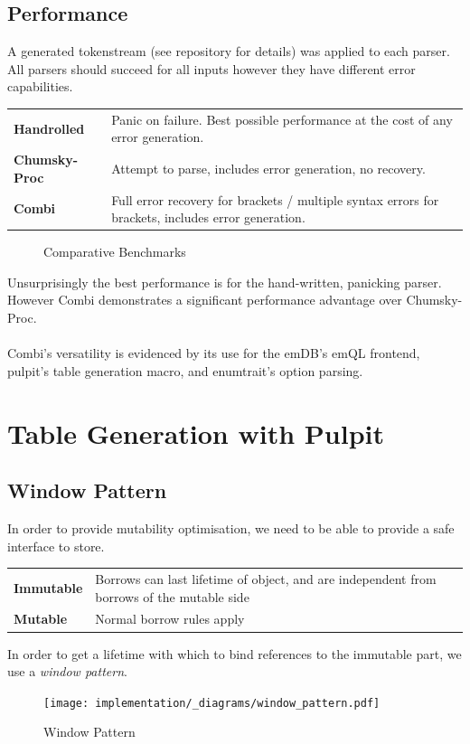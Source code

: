 \subsection{Performance}
A generated tokenstream (see repository for details) was applied to each parser. All parsers should succeed for all inputs however they have different error capabilities.
\begin{center}
    \begin{tabular}{l p{}}
        \textbf{Handrolled}   & Panic on failure. Best possible performance at the cost of any error generation.                   \\
        \textbf{Chumsky-Proc} & Attempt to parse, includes error generation, no recovery.                                          \\
        \textbf{Combi}        & Full error recovery for brackets / multiple syntax errors for brackets, includes error generation. \\
    \end{tabular}
\end{center}
\begin{figure}[h!]
    \centering
    \vspace{-0.4em}
    \resizebox{\textwidth}{!}{}
    \caption{Comparative Benchmarks}
\end{figure}
Unsurprisingly the best performance is for the hand-written, panicking parser.  However Combi demonstrates 
a significant performance advantage over Chumsky-Proc.
\\
\\ Combi's versatility is evidenced by its use for the emDB's emQL frontend, pulpit's table generation macro, and enumtrait's option parsing.
\section{Table Generation with Pulpit}

\subsection{Window Pattern}
\label{sec:window_pattern}
In order to provide mutability optimisation, we need to be able to provide a safe interface to store.
\begin{center}
    \begin{tabular}{l p{}}
        \textbf{Immutable} & Borrows can last lifetime of object, and are independent from borrows of the mutable side \\
        \textbf{Mutable}   & Normal borrow rules apply                                                                 \\
    \end{tabular}
\end{center}
In order to get a lifetime with which to bind references to the immutable part, we use a \textit{window pattern}.
\begin{figure}[h!]
    \centering
    \texttt{[image: implementation/\_diagrams/window\_pattern.pdf]}
    \caption{Window Pattern}
\end{figure}
